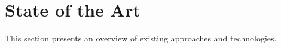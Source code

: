 \chapter{State of the Art}\label{ch:state-of-the-art}
This section presents an overview of existing approaches and technologies.










